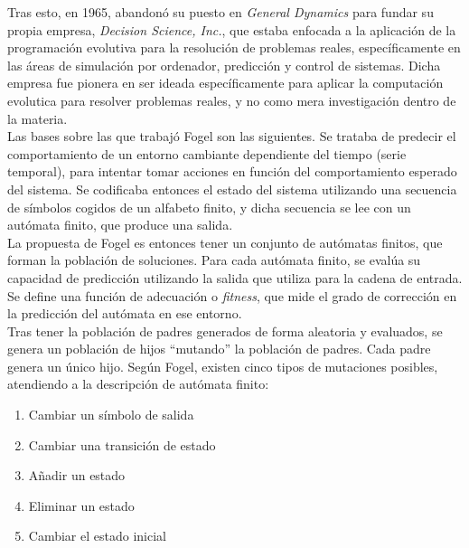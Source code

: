 \documentclass[12pt]{article} \usepackage[utf8]{inputenc}
\begin{document}
Tras esto, en 1965, abandonó su puesto en \textit{General Dynamics}
para fundar su propia empresa, \textit{Decision Science, Inc.}, que
estaba enfocada a la aplicación de la programación evolutiva para la
resolución de problemas reales, específicamente en las áreas de
simulación por ordenador, predicción y control de sistemas. Dicha
empresa fue pionera en ser ideada específicamente para aplicar la
computación evolutica para resolver problemas reales, y no como mera
investigación dentro de la materia.\\

Las bases sobre las que trabajó Fogel son las siguientes. Se trataba
de predecir el comportamiento de un entorno cambiante dependiente del
tiempo (serie temporal), para intentar tomar acciones en función del
comportamiento esperado del sistema. Se codificaba entonces el estado
del sistema utilizando una secuencia de símbolos cogidos de un
alfabeto finito, y dicha secuencia se lee con un autómata finito, que
produce una salida.\\

La propuesta de Fogel es entonces tener un conjunto de autómatas
finitos, que forman la población de soluciones. Para cada autómata
finito, se evalúa su capacidad de predicción utilizando la salida que
utiliza para la cadena de entrada. Se define una función de adecuación
o \textit{fitness}, que mide el grado de corrección en la predicción
del autómata en ese entorno.\\

Tras tener la población de padres generados de forma aleatoria y
evaluados, se genera un población de hijos ``mutando'' la población de
padres. Cada padre genera un único hijo. Según Fogel, existen cinco
tipos de mutaciones posibles, atendiendo a la descripción de autómata
finito:

\begin{enumerate}
\item Cambiar un símbolo de salida
\item Cambiar una transición de estado
\item Añadir un estado
\item Eliminar un estado
\item Cambiar el estado inicial
\end{enumerate}
\end{document}
